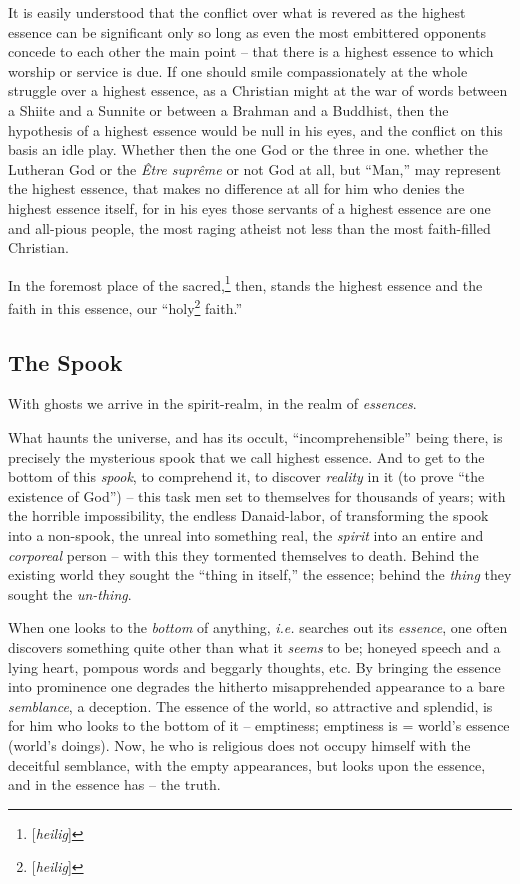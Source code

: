 \documentclass[12pt,a4paper]{book}
\begin{document}
It is easily understood that the conflict over what is revered as the highest 
essence can be significant only so long as even the most embittered opponents 
concede to each other the main point -- that there is a highest essence to 
which worship or service is due. If one should smile compassionately at the 
whole struggle over a highest essence, as a Christian might at the war of 
words between a Shiite and a Sunnite or between a Brahman and a Buddhist, then 
the hypothesis of a highest essence would be null in his eyes, and the 
conflict on this basis an idle play. Whether then the one God or the three in 
one. whether the Lutheran God or the \textit{\^Etre supr\^eme} or not God at 
all, but ``Man,'' may represent the highest essence, that makes no 
difference at all for him who denies the highest essence itself, for in his 
eyes those servants of a highest essence are one and all-pious people, the 
most raging atheist not less than the most faith-filled Christian.

In the foremost place of the sacred,\footnote{[\textit{heilig}]} then, stands 
the highest essence and the faith in this essence, our 
``holy\footnote{[\textit{heilig}]} faith.''

\medskip{}

\subsection[The Spook]{\centering The Spook}

With ghosts we arrive in the spirit-realm, in the realm of \textit{essences}.

What haunts the universe, and has its occult, ``incomprehensible'' being 
there, is precisely the mysterious spook that we call highest essence. And to 
get to the bottom of this \textit{spook}, to comprehend it, to discover 
\textit{reality} in it (to prove ``the existence of God'') -- this task men 
set to themselves for thousands of years; with the horrible impossibility, the 
endless Danaid-labor, of transforming the spook into a non-spook, the unreal 
into something real, the \textit{spirit} into an entire and \textit{corporeal} 
person -- with this they tormented themselves to death. Behind the existing 
world they sought the ``thing in itself,'' the essence; behind the 
\textit{thing} they sought the \textit{un-thing}.

When one looks to the \textit{bottom} of anything, \textit{i.e.} searches out 
its \textit{essence}, one often discovers something quite other than what it 
\textit{seems} to be; honeyed speech and a lying heart, pompous words and 
beggarly thoughts, etc. By bringing the essence into prominence one degrades 
the hitherto misapprehended appearance to a bare \textit{semblance}, a 
deception. The essence of the world, so attractive and splendid, is for him 
who looks to the bottom of it -- emptiness; emptiness is = world's essence 
(world's doings). Now, he who is religious does not occupy himself with the 
deceitful semblance, with the empty appearances, but looks upon the essence, 
and in the essence has -- the truth.
\end{document}
